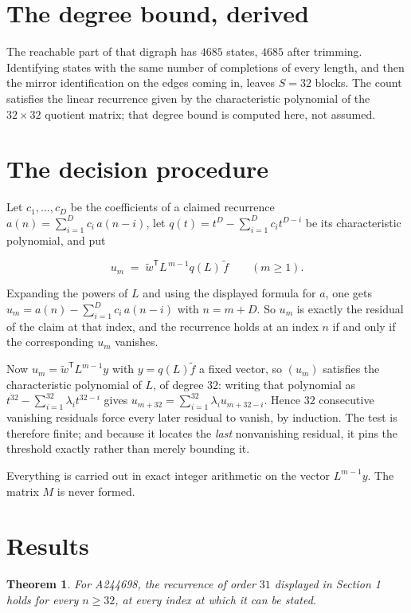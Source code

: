\documentclass[11pt]{article}
\newtheorem{theorem}{Theorem}
\theoremstyle{definition}
\begin{document}
\section{The degree bound, derived}

The reachable part of that digraph has $4685$ states, $4685$ after trimming. Identifying states with the same number of completions of every length, and then the mirror identification on the edges coming in, leaves $S = 32$ blocks. The count satisfies the linear recurrence given by the characteristic polynomial of the $32\times32$ quotient matrix; that degree bound is computed here, not assumed.

\section{The decision procedure}

Let $c_1,\dots,c_D$ be the coefficients of a claimed recurrence $a(n) = \sum_{i=1}^{D} c_i\,a(n-i)$, let $q(t) = t^{D} - \sum_{i=1}^{D} c_i t^{D-i}$ be its characteristic polynomial, and put

\[u_m \;=\; \tilde w^{\mathsf T} L^{\,m-1} q(L)\,\tilde f \qquad (m \ge 1).\]

Expanding the powers of $L$ and using the displayed formula for $a$, one gets $u_m = a(n) - \sum_{i=1}^{D} c_i\,a(n-i)$ with $n = m + D$. So $u_m$ is exactly the residual of the claim at that index, and the recurrence holds at an index $n$ if and only if the corresponding $u_m$ vanishes.

Now $u_m = \tilde w^{\mathsf T} L^{m-1} y$ with $y = q(L)\tilde f$ a fixed vector, so $(u_m)$ satisfies the characteristic polynomial of $L$, of degree $32$: writing that polynomial as $t^{32} - \sum_{i=1}^{32} \lambda_i t^{32-i}$ gives $u_{m+32} = \sum_{i=1}^{32} \lambda_i u_{m+32-i}$. Hence $32$ consecutive vanishing residuals force every later residual to vanish, by induction. The test is therefore finite; and because it locates the {\itshape last} nonvanishing residual, it pins the threshold exactly rather than merely bounding it.

Everything is carried out in exact integer arithmetic on the vector $L^{m-1}y$. The matrix $M$ is never formed.

\section{Results}

\begin{theorem} For A244698, the recurrence of order $31$ displayed in Section 1 holds for every $n \ge 32$, at every index at which it can be stated.\end{theorem}
\end{document}
